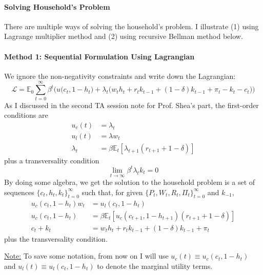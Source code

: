 \documentclass[12pt]{article}
\begin{document}
\paragraph{Solving Household's Problem} There are multiple ways of solving the household's problem. I illustrate (1) using Lagrange multiplier method and (2) using recursive Bellman method below.

\paragraph{Method 1: Sequential Formulation Using Lagrangian \\ [6pt]} We ignore the non-negativity constraints and write down the Lagrangian:
\begin{equation}
	\mathcal{L} = \mathbb{E}_0\sum_{t=0}^\infty \beta^t\Bigg(u\big(c_t, 1-h_t\big) + \lambda_t\Big(w_th_t + r_t k_{t-1} + (1-\delta) k_{t-1} + \pi_t - k_t - c_t \Big) \Bigg)
\end{equation}
As I discussed in the second TA session note for Prof. Shea's part, the first-order conditions are 
\begin{align}
	u_c(t) &= \lambda_t\\
	u_l(t) &= \lambda w_t\\
	\lambda_t &= \beta \mathbb{E}_t \left[\lambda_{t+1}(r_{t+1} + 1 - \delta)\right]
\end{align}
plus a transversality condition
\[\lim_{t\rightarrow \infty} \beta^t \lambda_t k_t = 0\]
By doing some algebra, we get the solution to the household problem is a set of sequences $\{c_t, h_t, k_t\}_{t=0}^\infty$ such that, for given $\{P_t, W_t, R_t, \Pi_t\}_{t=0}^\infty$ and $k_{-1}$,
\begin{align}
	u_c(c_t, 1-h_t)w_t &= u_l(c_t, 1-h_t)  \label{eq:HH_start} \\
	u_c(c_t, 1-h_t) &= \beta \mathbb{E}_t\left[u_c(c_{t+1}, 1-h_{t+1})(r_{t+1} + 1 - \delta)\right]\\
	c_t + k_t &= w_th_t + r_t k_{t-1} + (1-\delta) k_{t-1} + \pi_t \label{eq:HH_end}
\end{align}
plus the transversality condition.

\underline{Note:} To save some notation, from now on I will use $u_c(t) \equiv u_c(c_t, 1-h_t)$ and $u_l(t) \equiv  u_l(c_t, 1-h_t)$ to denote the marginal utility terms.
\end{document}
